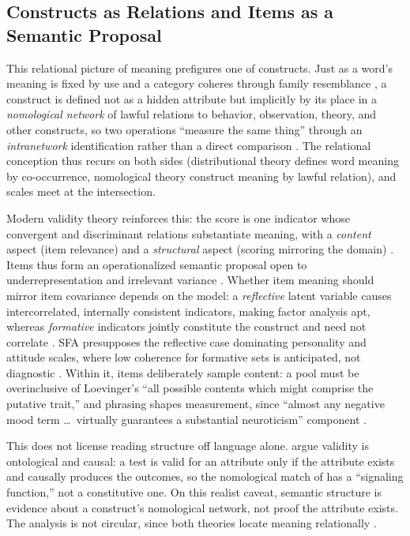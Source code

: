 \subsection{Constructs as Relations and Items as a Semantic Proposal}

This relational picture of meaning prefigures one of constructs. Just as a word's
meaning is fixed by use and a category coheres through family resemblance
\citep[\S43,~\S\S66--67]{wittgenstein-1953}, a construct is defined not as a hidden
attribute but implicitly by its place in a \emph{nomological network} of lawful
relations to behavior, observation, theory, and other constructs, so two operations
``measure the same thing'' through an \emph{intranetwork} identification rather than
a direct comparison \citep{cronbach-meehl-1955}. The relational conception thus
recurs on both sides (distributional theory defines word meaning by co-occurrence,
nomological theory construct meaning by lawful relation), and scales meet at the
intersection.

Modern validity theory reinforces this: the score is one indicator whose
convergent and discriminant relations substantiate meaning, with a \emph{content}
aspect (item relevance) and a \emph{structural} aspect (scoring mirroring the
domain) \citep{messick-1995, cronbach-meehl-1955}. Items thus form an
operationalized semantic proposal open to underrepresentation and irrelevant
variance \citep{messick-1995}. Whether item meaning should mirror item
covariance depends on the model: a \emph{reflective} latent variable causes
intercorrelated, internally consistent indicators, making factor analysis apt,
whereas \emph{formative} indicators jointly constitute the construct and need not
correlate \citep{bollen-lennox-1991}. SFA presupposes the reflective case
dominating personality and attitude scales, where low coherence for formative sets
is anticipated, not diagnostic \citep{bollen-lennox-1991}. Within it, items
deliberately sample content: a pool must be overinclusive of Loevinger's ``all
possible contents which might comprise the putative trait,'' and phrasing shapes
measurement, since ``almost any negative mood term \ldots\ virtually guarantees a
substantial neuroticism'' component \citep{clark-watson-2019}.

This does not license reading structure off language alone.
\citet{borsboom-etal-2004} argue validity is ontological and causal: a test is
valid for an attribute only if the attribute exists and causally produces the
outcomes, so the nomological match of \citet{cronbach-meehl-1955} has a
``signaling function,'' not a constitutive one. On this realist caveat, semantic
structure is evidence about a construct's nomological network, not proof the
attribute exists. The analysis is not circular, since both theories locate meaning
relationally \citep{borsboom-etal-2004}.

